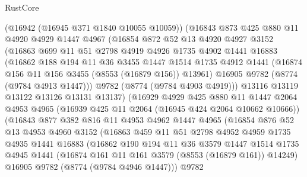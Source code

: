 \begin{lexlean}{RustCore}
\begin{coremodule}
          (@16942 (@16945 @371 @1840 @10055 @10059))
          (@16843
            @873
            @425
            @880
            @11
            @4920
            @4929
            @1447
            @4967
            (@16854
              @872
              @52
              @13
              @4920
              @4927
              @3152
              (@16863
                @699
                @11
                @51
                @2798
                @4919
                @4926
                @1735
                @4902
                @1441
                @16883
                (@16862
                  @188
                  @194
                  @11
                  @36
                  @3455
                  @1447
                  @1514
                  @1735
                  @4912
                  @1441
                  (@16874 @156 @11 @156 @3455 (@8553 (@16879 @156)) @13961)
                  @16905
                  @9782
                  (@8774 (@9784 @4913 @1447)))
                @9782
                (@8774 (@9784 @4903 @4919)))
              @13116
              @13119
              @13122
              @13126
              @13131
              @13137)
            (@16929
              @4929
              @425
              @880
              @11
              @1447
              @2064
              @4953
              @4965
              (@16939 @425 @11 @2064 (@16945 @424 @2064 @10662 @10666))
              (@16843
                @877
                @382
                @816
                @11
                @4953
                @4962
                @1447
                @4965
                (@16854
                  @876
                  @52
                  @13
                  @4953
                  @4960
                  @3152
                  (@16863
                    @459
                    @11
                    @51
                    @2798
                    @4952
                    @4959
                    @1735
                    @4935
                    @1441
                    @16883
                    (@16862
                      @190
                      @194
                      @11
                      @36
                      @3579
                      @1447
                      @1514
                      @1735
                      @4945
                      @1441
                      (@16874 @161 @11 @161 @3579 (@8553 (@16879 @161)) @14249)
                      @16905
                      @9782
                      (@8774 (@9784 @4946 @1447)))
                    @9782

\end{coremodule}
\end{lexlean}
